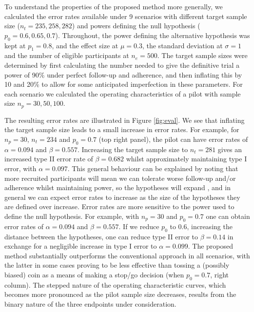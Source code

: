 \documentclass[AMA,STIX1COL]{WileyNJD-v2}
\begin{document}
To understand the properties of the proposed method more generally, we calculated the error rates available under 9 scenarios with different target sample size ($n_t = 235, 258, 282$) and powers defining the null hypothesis ($p_0 = 0.6, 0.65, 0.7$). Throughout, the power defining the alternative hypothesis was kept at $p_1 = 0.8$, and the effect size at $\mu = 0.3$, the standard deviation at $\sigma = 1$ and the number of eligible participants at $n_e = 500$. The target sample sizes were determined by first calculating the number needed to give the definitive trial a power of 90\% under perfect follow-up and adherence, and then inflating this by 10 and 20\% to allow for some anticipated imperfection in these parameters. For each scenario we calculated the operating characteristics of a pilot with sample size $n_p = 30, 50, 100$.

 
The resulting error rates are illustrated in Figure \ref{fig:eval}. We see that inflating the target sample size leads to a small increase in error rates. For example, for $n_p = 30$, $n_t = 234$ and $p_0 = 0.7$ (top right panel), the pilot can have error rates of $\alpha = 0.094$ and $\beta = 0.557$. Increasing the target sample size to $n_t = 281$ gives an increased type II error rate of $\beta = 0.682$ whilst approximately maintaining type I error, with $\alpha = 0.097$. This general behaviour can be explained by noting that more recruited participants will mean we can tolerate worse follow-up and/or adherence whilst maintaining power, so the hypotheses will expand , and in general we can expect error rates to increase as the size of the hypotheses they are defined over increase. Error rates are more sensitive to the power used to define the null hypothesis. For example, with $n_p = 30$ and $p_0 = 0.7$ one can obtain error rates of $\alpha = 0.094$ and $\beta = 0.557$. If we reduce $p_0$ to 0.6, increasing the distance between the hypotheses, one can reduce type II error to $\beta = 0.14$ in exchange for a negligible increase in type I error to $\alpha = 0.099$. The proposed method substantially outperforms the conventional approach in all scenarios, with the latter in some cases proving to be less effective than tossing a (possibly biased) coin as a means of making a stop/go decision (when $p_0 = 0.7$, right column). The stepped nature of the operating characteristic curves, which becomes more pronounced as the pilot sample size decreases, results from the binary nature of the three endpoints under consideration.
\end{document}
